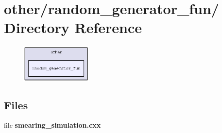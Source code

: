 \section{other/random\_\-generator\_\-fun/ Directory Reference}
\label{dir_5d0d611add8e5e6097c2aafca0b7d410}


\begin{figure}[H]
\begin{center}
\leavevmode
\includegraphics[width=101pt]{dir_5d0d611add8e5e6097c2aafca0b7d410_dep}
\end{center}
\end{figure}
\subsection*{Files}
\begin{CompactItemize}
\item 
file \textbf{smearing\_\-simulation.cxx}
\end{CompactItemize}
